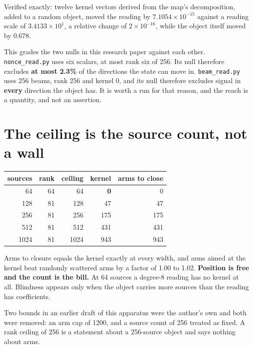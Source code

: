 Verified exactly: twelve kernel vectors derived from the map's decomposition, added to a random
object, moved the reading by \(7.1054 \times 10^{-15}\) against a reading scale of
\(3.4133 \times 10^{1}\), a relative change of \(2 \times 10^{-16}\), while the object itself moved
by \(0.678\).

This grades the two nulls in this research paper against each other. \texttt{nonce\_read.py} uses six scalars,
at most rank six of 256. Its null therefore excludes \textbf{at most 2.3\%} of the directions the state can
move in. \texttt{beam\_read.py} uses 256 beams, rank 256 and kernel 0, and its null therefore excludes
signal in \textbf{every} direction the object has. It is worth a run for that reason, and the reach is a
quantity, and not an assertion.

\section{The ceiling is the source count, not a wall}

\begin{center}
\begin{tabular}{rrrrr}
\toprule
sources & rank & ceiling & kernel & arms to close \\
\midrule
64 & 64 & 64 & \textbf{0} & 0 \\
128 & 81 & 128 & 47 & 47 \\
256 & 81 & 256 & 175 & 175 \\
512 & 81 & 512 & 431 & 431 \\
1024 & 81 & 1024 & 943 & 943 \\
\bottomrule
\end{tabular}
\end{center}

Arms to closure equals the kernel exactly at every width, and arms aimed at the kernel beat randomly
scattered arms by a factor of 1.00 to 1.02. \textbf{Position is free and the count is the bill.} At
64 sources a degree-8 reading has no kernel at all. Blindness appears only when the object carries
more sources than the reading has coefficients.

Two bounds in an earlier draft of this apparatus were the author's own and both were removed: an arm
cap of 1200, and a source count of 256 treated as fixed. A rank ceiling of 256 is a statement about a
256-source object and says nothing about arms.
